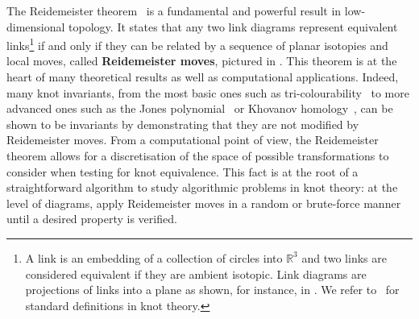 \documentclass{article}
\newcommand{\R}{\mathbb{R}}
\begin{document}
The Reidemeister theorem~\cite{Reidemeister_reidemeister_th} is a fundamental and powerful result in low-dimensional topology. It states that any two link diagrams represent equivalent links\footnote{A link is an embedding of a collection of circles into $\R^3$ and two links are considered equivalent if they are ambient isotopic. Link diagrams are projections of links into a plane as shown, for instance, in . We refer to~ for standard definitions in knot theory.} if and only if they can be related by a sequence of planar isotopies and local moves, called \textbf{Reidemeister moves}, pictured in . This theorem is at the heart of many theoretical results as well as computational applications. Indeed, many knot invariants, from the most basic ones such as tri-colourability~\cite[Section~1.5]{Adams_knotbook} to more advanced ones such as the Jones polynomial~\cite{Kauffman_Jones_poly} or Khovanov homology~\cite{bar2002khovanov}, can be shown to be invariants by demonstrating that they are not modified by Reidemeister moves. From a computational point of view, the Reidemeister theorem allows for a discretisation of the space of possible transformations to consider when testing for knot equivalence. This fact is at the root of a straightforward algorithm to study algorithmic problems in knot theory: at the level of diagrams, apply Reidemeister moves in a random or brute-force manner until a desired property is verified. 
\end{document}
